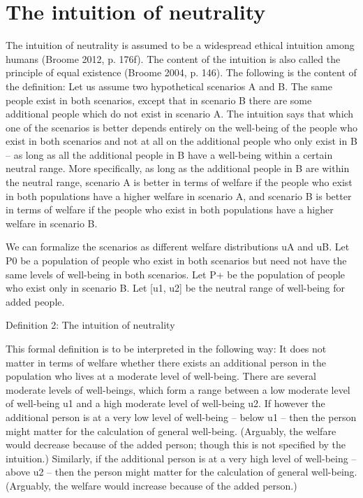 \chapter{The intuition of neutrality}

The intuition of neutrality is assumed to be a widespread ethical intuition among humans (\label{ref:RND5BNnNe71j8}Broome 2012, p. 176f). The content of the intuition is also called the principle of equal existence (\label{ref:RNDaWHBLx2kgv}Broome 2004, p. 146). The following is the content of the definition: Let us assume two hypothetical scenarios A and B. The same people exist in both scenarios, except that in scenario B there are some additional people which do not exist in scenario A. The intuition says that which one of the scenarios is better depends entirely on the well-being of the people who exist in both scenarios and not at all on the additional people who only exist in B – as long as all the additional people in B have a well-being within a certain neutral range. More specifically, as long as the additional people in B are within the neutral range, scenario A is better in terms of welfare if the people who exist in both populations have a higher welfare in scenario A, and scenario B is better in terms of welfare if the people who exist in both populations have a higher welfare in scenario B.  

We can formalize the scenarios as different welfare distributions uA and uB. Let P0 be a population of people who exist in both scenarios but need not have the same levels of well-being in both scenarios. Let P+ be the population of people who exist only in scenario B. Let [u1, u2] be the neutral range of well-being for added people.  

Definition 2: The intuition of neutrality 
\begin{comment}
${\exists}$u1, u2: ( ${\forall}$ x ${\in}$ P+ : uB(x) ${\in}$ [u1, u2] ) \ding{213} 

( uB(P0) {\textgreater} uA(P0) \ \ \ding{213} \ \ uB(P0 ${\cup}$ P+) {\textgreater} uA(P0) ) ${\wedge}$  

( uB(P0) {\textless} uA(P0) \ \ \ding{213} \ \ uB(P0 ${\cup}$ P+) {\textless} uA(P0) )  
\end{comment}

This formal definition is to be interpreted in the following way: It does not matter in terms of welfare whether there exists an additional person in the population who lives at a moderate level of well-being. There are several moderate levels of well-beings, which form a range between a low moderate level of well-being u1 and a high moderate level of well-being u2. If however the additional person is at a very low level of well-being – below u1 – then the person might matter for the calculation of general well-being. (Arguably, the welfare would decrease because of the added person; though this is not specified by the intuition.) Similarly, if the additional person is at a very high level of well-being – above u2 – then the person might matter for the calculation of general well-being. (Arguably, the welfare would increase because of the added person.) 

